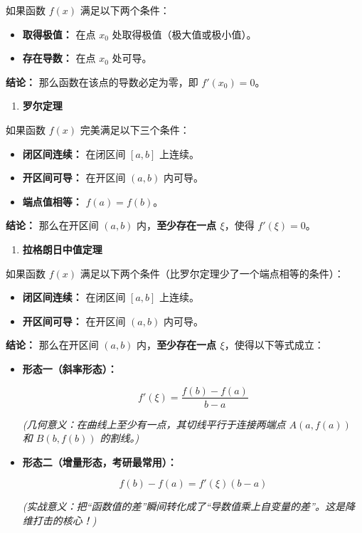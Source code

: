 \documentclass[
]{article}
\begin{document}
如果函数 \(f(x)\) 满足以下两个条件：

\begin{itemize}
\item
  \textbf{取得极值：} 在点 \(x_0\) 处取得极值（极大值或极小值）。
\item
  \textbf{存在导数：} 在点 \(x_0\) 处可导。
\end{itemize}

\textbf{结论：} 那么函数在该点的导数必定为零，即
\textbf{\(f'(x_0) = 0\)}。

\begin{enumerate}
\def\labelenumi{\arabic{enumi}.}
\item
  \textbf{罗尔定理}
\end{enumerate}

如果函数 \(f(x)\) 完美满足以下三个条件：

\begin{itemize}
\item
  \textbf{闭区间连续：} 在闭区间 \([a, b]\) 上连续。
\item
  \textbf{开区间可导：} 在开区间 \((a, b)\) 内可导。
\item
  \textbf{端点值相等：} \(f(a) = f(b)\)。
\end{itemize}

\textbf{结论：} 那么在开区间 \((a, b)\) 内，\textbf{至少存在一点
\(\xi\)}，使得 \textbf{\(f'(\xi) = 0\)}。

\begin{enumerate}
\def\labelenumi{\arabic{enumi}.}
\item
  \textbf{拉格朗日中值定理}
\end{enumerate}

如果函数 \(f(x)\) 满足以下两个条件（比罗尔定理少了一个端点相等的条件）：

\begin{itemize}
\item
  \textbf{闭区间连续：} 在闭区间 \([a, b]\) 上连续。
\item
  \textbf{开区间可导：} 在开区间 \((a, b)\) 内可导。
\end{itemize}

\textbf{结论：} 那么在开区间 \((a, b)\) 内，\textbf{至少存在一点
\(\xi\)}，使得以下等式成立：

\begin{itemize}
\item
  \textbf{形态一（斜率形态）：}

  \[f'(\xi) = \frac{f(b) - f(a)}{b - a}\]

  \emph{(几何意义：在曲线上至少有一点，其切线平行于连接两端点
  \(A(a, f(a))\) 和 \(B(b, f(b))\) 的割线。)}
\item
  \textbf{形态二（增量形态，考研最常用）：}

  \[f(b) - f(a) = f'(\xi)(b - a)\]

  \emph{(实战意义：把``函数值的差''瞬间转化成了``导数值乘上自变量的差''。这是降维打击的核心！)}
\end{itemize}
\end{document}
